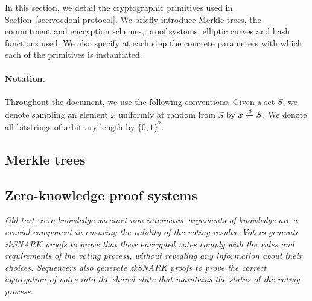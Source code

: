 
In this section, we detail the cryptographic primitives used in Section~\ref{sec:vocdoni-protocol}. We briefly introduce Merkle trees, the commitment and encryption schemes, proof systems, elliptic curves and hash functions used. We also specify at each step the concrete parameters with which each of the primitives is instantiated.\\


\paragraph{Notation.} Throughout the document, we use the following conventions. Given a set $S$, we denote sampling an element $x$ uniformly at random from $S$ by $x \xleftarrow{\$} S$. We denote all bitstrings of arbitrary length by $\{0,1\}^*$. 

\subsection{Merkle trees}
\label{sec:cryptographic-primitives:merkle-trees}


\subsection{Zero-knowledge proof systems}
\label{sec:cryptographic-primitives:zkp}

\textit{Old text: zero-knowledge succinct non-interactive arguments of knowledge are a crucial component in ensuring the validity of the voting results. Voters generate zkSNARK proofs to prove that their encrypted votes comply with the rules and requirements of the voting process, without revealing any information about their choices. Sequencers also generate zkSNARK proofs to prove the correct aggregation of votes into the shared state that maintains the status of the voting process.}

